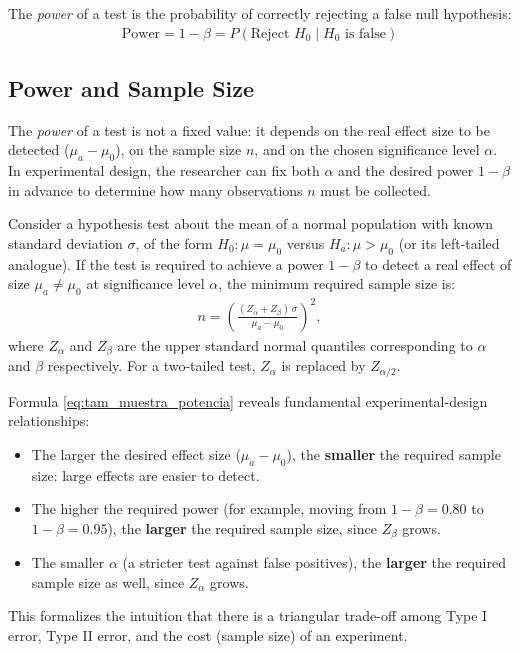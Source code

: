 \begin{observacion}
	The \emph{power} of a test is the probability of correctly rejecting a false null hypothesis:
	\begin{align}
		\text{Power} = 1 - \beta = P(\text{Reject } H_0 \mid H_0 \text{ is false})
	\end{align}
\end{observacion}

\subsection{Power and Sample Size}

The \emph{power} of a test is not a fixed value: it depends on the real effect size to be detected ($\mu_a - \mu_0$), on the sample size $n$, and on the chosen significance level $\alpha$. In experimental design, the researcher can fix both $\alpha$ and the desired power $1-\beta$ in advance to determine how many observations $n$ must be collected.

\begin{teorema}
	Consider a hypothesis test about the mean of a normal population with known standard deviation $\sigma$, of the form $H_0: \mu = \mu_0$ versus $H_a: \mu > \mu_0$ (or its left-tailed analogue). If the test is required to achieve a power $1-\beta$ to detect a real effect of size $\mu_a \neq \mu_0$ at significance level $\alpha$, the minimum required sample size is:
	\begin{align}
		n = \left( \frac{(Z_\alpha + Z_\beta)\, \sigma}{\mu_a - \mu_0} \right)^2,
		\label{eq:tam_muestra_potencia}
	\end{align}
	where $Z_\alpha$ and $Z_\beta$ are the upper standard normal quantiles corresponding to $\alpha$ and $\beta$ respectively. For a two-tailed test, $Z_\alpha$ is replaced by $Z_{\alpha/2}$.
\end{teorema}

\begin{observacion}
	Formula \eqref{eq:tam_muestra_potencia} reveals fundamental experimental-design relationships:
	\begin{itemize}
		\item The larger the desired effect size ($\mu_a - \mu_0$), the \textbf{smaller} the required sample size: large effects are easier to detect.
		\item The higher the required power (for example, moving from $1-\beta = 0.80$ to $1-\beta = 0.95$), the \textbf{larger} the required sample size, since $Z_\beta$ grows.
		\item The smaller $\alpha$ (a stricter test against false positives), the \textbf{larger} the required sample size as well, since $Z_\alpha$ grows.
	\end{itemize}
	This formalizes the intuition that there is a triangular trade-off among Type I error, Type II error, and the cost (sample size) of an experiment.
\end{observacion}
